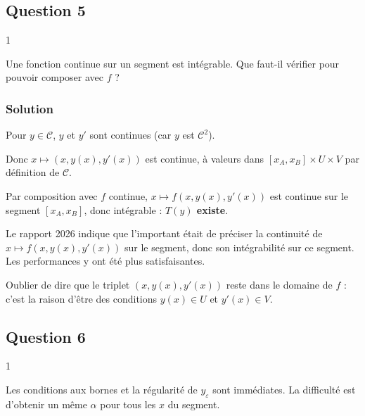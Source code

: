 \documentclass[11pt,a4paper]{article}
\begin{document}
\hypertarget{question-5}{%
\subsection{Question 5}\label{question-5}}

\begin{indication}{1}

Une fonction continue sur un segment est intégrable. Que faut-il vérifier pour pouvoir composer avec \(f\) ?

\end{indication}

\hypertarget{solution-4}{%
\subsubsection{Solution}\label{solution-4}}

Pour \(y\in\mathcal C\), \(y\) et \(y'\) sont continues (car \(y\) est \(\mathcal C^2\)).

Donc \(x\mapsto(x,y(x),y'(x))\) est continue, à valeurs dans \([x_A,x_B]\times U\times V\) par définition de \(\mathcal C\).

Par composition avec \(f\) continue, \(x\mapsto f(x,y(x),y'(x))\) est continue sur le segment \([x_A,x_B]\), donc intégrable : \textbf{\(T(y)\) existe}.

\begin{jury}

Le rapport 2026 indique que l'important était de préciser la continuité de \(x\mapsto f(x,y(x),y'(x))\) sur le segment, donc son intégrabilité sur ce segment. Les performances y ont été plus satisfaisantes.

\end{jury}

\begin{piege}

Oublier de dire que le triplet \((x,y(x),y'(x))\) reste dans le domaine de \(f\) : c'est la raison d'être des conditions \(y(x)\in U\) et \(y'(x)\in V\).

\end{piege}

\hypertarget{question-6}{%
\subsection{Question 6}\label{question-6}}

\begin{indication}{1}

Les conditions aux bornes et la régularité de \(y_\varepsilon\) sont immédiates. La difficulté est d'obtenir un même \(\alpha\) pour tous les \(x\) du segment.

\end{indication}
\end{document}
